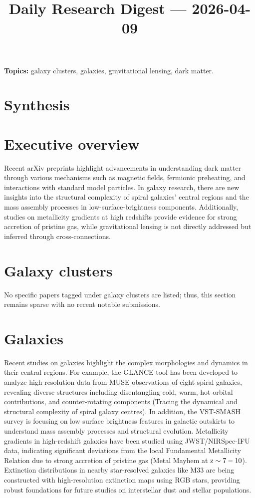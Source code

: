 \documentclass[11pt]{article}
\begin{document}
\title{Daily Research Digest --- 2026-04-09}
\author{}
\date{}
\maketitle
\textbf{Topics:} galaxy clusters, galaxies, gravitational lensing, dark matter.
\section*{Synthesis}
\section*{Executive overview}
Recent arXiv preprints highlight advancements in understanding dark matter through various mechanisms such as magnetic fields, fermionic preheating, and interactions with standard model particles. In galaxy research, there are new insights into the structural complexity of spiral galaxies' central regions and the mass assembly processes in low-surface-brightness components. Additionally, studies on metallicity gradients at high redshifts provide evidence for strong accretion of pristine gas, while gravitational lensing is not directly addressed but inferred through cross-connections.
\section*{Galaxy clusters}
No specific papers tagged under galaxy clusters are listed; thus, this section remains sparse with no recent notable submissions.
\section*{Galaxies}
Recent studies on galaxies highlight the complex morphologies and dynamics in their central regions. For example, the GLANCE tool has been developed to analyze high-resolution data from MUSE observations of eight spiral galaxies, revealing diverse structures including disentangling cold, warm, hot orbital contributions, and counter-rotating components (Tracing the dynamical and structural complexity of spiral galaxy centres). In addition, the VST-SMASH survey is focusing on low surface brightness features in galactic outskirts to understand mass assembly processes and structural evolution. Metallicity gradients in high-redshift galaxies have been studied using JWST/NIRSpec-IFU data, indicating significant deviations from the local Fundamental Metallicity Relation due to strong accretion of pristine gas (Metal Mayhem at $\rm z \sim 7-10$). Extinction distributions in nearby star-resolved galaxies like M33 are being constructed with high-resolution extinction maps using RGB stars, providing robust foundations for future studies on interstellar dust and stellar populations.
\end{document}
